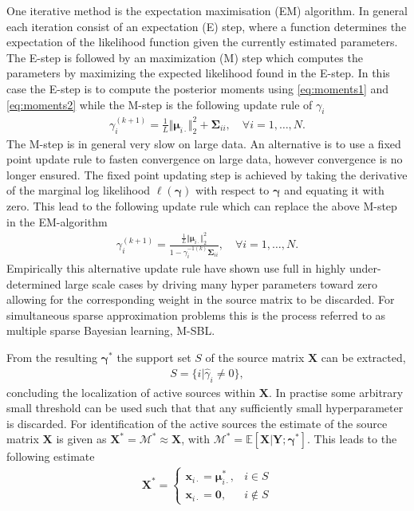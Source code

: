 One iterative method is the expectation maximisation (EM) algorithm.
In general each iteration consist of an expectation (E) step, where a function determines the expectation of the likelihood function given the currently estimated parameters. The E-step is followed by an maximization (M) step which computes the parameters by maximizing the expected likelihood found in the E-step.
In this case the E-step is to compute the posterior moments using \eqref{eq:moments1} and \eqref{eq:moments2} while the M-step is the following update rule of $\gamma_i$ \cite[p.147]{phd_wipf}
\begin{align*}
\gamma_i^{(k+1)} = \frac{1}{L} \Vert \boldsymbol{\mu}_{i \cdot} \Vert_2^2 + \boldsymbol{\Sigma}_{ii}, \quad \forall i = 1, \dots, N.
\end{align*}
The M-step is in general very slow on large data. 
An alternative is to use a fixed point update rule to fasten convergence on large data, however convergence is no longer ensured. 
The fixed point updating step is achieved by taking the derivative of the marginal log likelihood $\ell(\boldsymbol{\gamma})$ with respect to $\boldsymbol{\gamma}$ and equating it with zero. 
This lead to the following update rule which can replace the above M-step in the EM-algorithm
\begin{align*}
\gamma_i^{(k+1)} = \frac{\frac{1}{L} \Vert \boldsymbol{\mu}_{i \cdot} \Vert_2^2}{1 - \gamma_i^{-1 (k)} \boldsymbol{\Sigma}_{ii}}, \quad \forall i = 1, \dots, N.
\end{align*}
Empirically this alternative update rule have shown use full in highly under-determined large scale cases by driving many hyper parameters toward zero allowing for the corresponding weight in the source matrix to be discarded. 
For simultaneous sparse approximation problems this is the process referred to as multiple sparse Bayesian learning, M-SBL.

From the resulting $\boldsymbol{\gamma}^\ast$ the support set $S$ of the source matrix $\mathbf{X}$ can be extracted, 
\begin{align*}
S = \{ i \vert \hat{\gamma}_i \neq 0 \},
\end{align*}
concluding the localization of active sources within $\mathbf{X}$. 
In practise some arbitrary small threshold can be used such that that any sufficiently small hyperparameter is discarded.
For identification of the active sources the estimate of the source matrix $\mathbf{X}$ is given as $\mathbf{X}^\ast = \mathcal{M}^\ast \approx \mathbf{X}$, with $\mathcal{M}^\ast = \mathbb{E}[\mathbf{X}\vert \mathbf{Y} ; \boldsymbol{\gamma}^\ast]$. 
This leads to the following estimate  
\begin{align*}
\mathbf{X}^\ast = 
\begin{cases}
\mathbf{x}_{i\cdot} = \boldsymbol{\mu}_{i \cdot}^\ast, & i \in S \\
\mathbf{x}_{i\cdot} = \mathbf{0}, & i \not \in S
\end{cases}
\end{align*}

